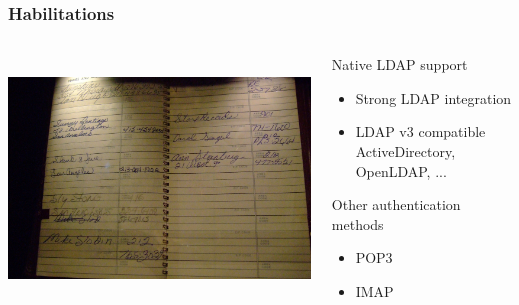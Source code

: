 \documentclass{beamer}
\begin{document}
\begin{frame}
    \frametitle{Habilitations}


 \begin{columns}
 \begin{column}{0.34\textwidth}
    \includegraphics[height=6.5cm]{pics/addressbook.jpg}
 \end{column}
 \begin{column}{0.90\textwidth}
    \begin{block}{Native LDAP support}
        \begin{itemize}
            \item Strong LDAP integration
            \item LDAP v3 compatible \\
            {\small ActiveDirectory, OpenLDAP, ...}
        \end{itemize}
    \end{block}

    \begin{block}{Other authentication methods}
        \begin{itemize}
            \item POP3
            \item IMAP
        \end{itemize}
    \end{block}
 \end{column}
\end{columns}
\end{frame}
\end{document}
